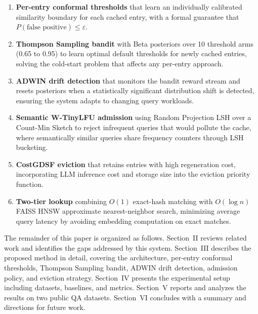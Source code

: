 \documentclass[conference]{IEEEtran}
\begin{document}
\begin{enumerate}[leftmargin=*]
\item \textbf{Per-entry conformal thresholds} that learn an individually calibrated similarity boundary for each cached entry, with a formal guarantee that $P(\text{false positive}) \leq \varepsilon$.

\item \textbf{Thompson Sampling bandit} with Beta posteriors over 10 threshold arms (0.65 to 0.95) to learn optimal default thresholds for newly cached entries, solving the cold-start problem that affects any per-entry approach.

\item \textbf{ADWIN drift detection} that monitors the bandit reward stream and resets posteriors when a statistically significant distribution shift is detected, ensuring the system adapts to changing query workloads.

\item \textbf{Semantic W-TinyLFU admission} using Random Projection LSH over a Count-Min Sketch to reject infrequent queries that would pollute the cache, where semantically similar queries share frequency counters through LSH bucketing.

\item \textbf{CostGDSF eviction} that retains entries with high regeneration cost, incorporating LLM inference cost and storage size into the eviction priority function.

\item \textbf{Two-tier lookup} combining $O(1)$ exact-hash matching with $O(\log n)$ FAISS HNSW approximate nearest-neighbor search, minimizing average query latency by avoiding embedding computation on exact matches.
\end{enumerate}

The remainder of this paper is organized as follows. Section~II reviews related work and identifies the gaps addressed by this system. Section~III describes the proposed method in detail, covering the architecture, per-entry conformal thresholds, Thompson Sampling bandit, ADWIN drift detection, admission policy, and eviction strategy. Section~IV presents the experimental setup including datasets, baselines, and metrics. Section~V reports and analyzes the results on two public QA datasets. Section~VI concludes with a summary and directions for future work.

\end{document}
